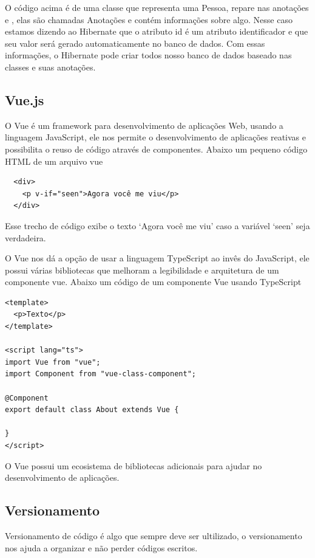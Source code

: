 \documentclass[12pt]{article}
\begin{document}
O código acima é de uma classe que representa uma Pessoa, repare nas anotações
\@Id e \@GeneratedValue, elas são chamadas Anotações e contém informações sobre algo.
Nesse caso estamos dizendo ao Hibernate que o atributo id é um atributo identificador
e que seu valor será gerado automaticamente no banco de dados. Com essas informações, o
Hibernate pode criar todos nosso banco de dados baseado nas classes e suas anotações.

\subsection{Vue.js}

O Vue é um framework para desenvolvimento de aplicações Web, usando a linguagem JavaScript,
ele nos permite o desenvolvimento de aplicações reativas e possibilita o reuso
de código através de componentes. Abaixo um pequeno código HTML de um arquivo vue

\begin{verbatim}
  <div>
    <p v-if="seen">Agora você me viu</p>
  </div>
\end{verbatim}

Esse trecho de código exibe o texto `Agora você me viu' caso a variável `seen' seja verdadeira.

O Vue nos dá a opção de usar a linguagem TypeScript ao invês do JavaScript, ele possui
várias bibliotecas que melhoram a legibilidade e arquitetura de um componente vue.
Abaixo um código de um componente Vue usando TypeScript

\begin{verbatim}
<template>
  <p>Texto</p>
</template>

<script lang="ts">
import Vue from "vue";
import Component from "vue-class-component";

@Component
export default class About extends Vue {

}
</script>
\end{verbatim}

O Vue possui um ecosistema de bibliotecas adicionais para ajudar no desenvolvimento de aplicações.

\subsection{Versionamento}

Versionamento de código é algo que sempre deve ser ultilizado, o versionamento nos ajuda a
organizar e não perder códigos escritos.
\end{document}
